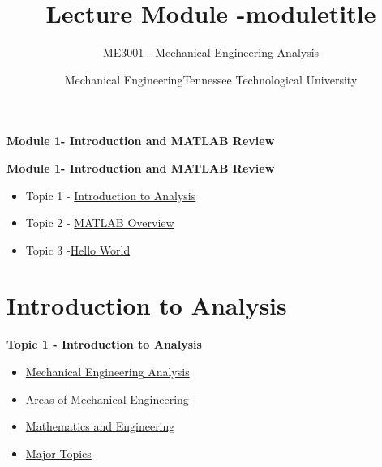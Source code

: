 \documentclass[fleqn]{ltx-talk} %
\author{ME3001 - Mechanical Engineering Analysis}
\title{Lecture Module -moduletitle}
\date{Mechanical Engineering\vspc Tennessee Technological University}
\newcommand{\MNUM}{1\hspace{2mm}} %
\newcommand{\moduletitle}{Introduction and MATLAB Review}
\newcommand{\sectionItitle}{Introduction to Analysis}
\newcommand{\sectionIItitle}{MATLAB Overview}
\newcommand{\sectionIIItitle}{Hello World}
\newcommand{\sectionIsubsectionItitle}{Mechanical Engineering Analysis}
\newcommand{\sectionIsubsectionIItitle}{Areas of Mechanical Engineering}
\newcommand{\sectionIsubsectionIIItitle}{Mathematics and Engineering}
\newcommand{\sectionIsubsectionIVtitle}{Major Topics}
\begin{document}
	\begin{frame}
		
		\begin{framed}\Large\textbf{Module \MNUM - \moduletitle}\end{framed}
	\end{frame}


	\begin{frame}
		
		\large\textbf{Module \MNUM - \moduletitle} \vspace{3mm}\\

		\begin{itemize}
			\item Topic 1 - \hyperref[sectionI]{\sectionItitle} \vspc %
			\item Topic 2 - \hyperref[sectionII]{\sectionIItitle} \vspc %
			\item Topic 3 -\hyperref[sectionIII]{\sectionIIItitle} \vspc %
		\end{itemize}

	\end{frame}

	\section{\sectionItitle}\label{sectionI}

		\begin{frame} 
			\large\textbf{Topic 1 - \sectionItitle} \vspace{3mm}\\

			\begin{itemize}
				\item \hyperref[sectionIsubsectionI]{\sectionIsubsectionItitle} \vspc %
				\item \hyperref[sectionIsubsectionII]{\sectionIsubsectionIItitle} \vspc %
				\item \hyperref[sectionIsubsectionIII]{\sectionIsubsectionIIItitle} \vspc %
				\item \hyperref[sectionIsubsectionIV]{\sectionIsubsectionIVtitle} \vspc %
			\end{itemize}
		\end{frame}
		
\end{document}
